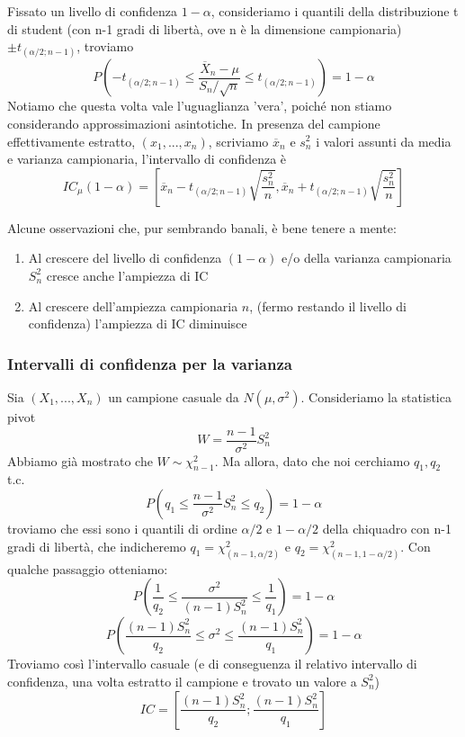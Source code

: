 Fissato un livello di confidenza $1-\alpha$, consideriamo i quantili della distribuzione t di student (con n-1 gradi di libertà, ove n è la dimensione campionaria) 
$\pm t_{(\alpha/2;n-1)}$, 
troviamo $$ P\left(-t_{(\alpha/2;n-1)} \leq \frac{\overline{X}_n - \mu}{S_n / \sqrt{n}}
 \leq t_{(\alpha/2;n-1)}\right) = 1 - \alpha $$
Notiamo che questa volta vale l'uguaglianza 'vera', poiché non stiamo considerando approssimazioni asintotiche. 
In presenza del campione effettivamente estratto, $(x_1,...,x_n)$, 
scriviamo $\overline{x}_n$ e $s^2_n$ i valori assunti da media e varianza campionaria,
l'intervallo di confidenza è $$IC_{\mu}(1-\alpha)=
\left[\overline{x}_n -
 t_{(\alpha / 2;n-1)} 
 \sqrt{\frac{s^2_n}{n}},
  \overline{x}_n + t_{(\alpha / 2;n-1)}\sqrt{\frac{s^2_n}{n}}\right]$$
\begin{oss}
Alcune osservazioni che, pur sembrando banali, è bene tenere a mente:
\begin{enumerate}
\item Al crescere del livello di confidenza $(1-\alpha)$ e/o della varianza campionaria $S^2_n$ cresce anche l'ampiezza di IC
\item Al crescere dell'ampiezza campionaria $n$, (fermo restando il livello di confidenza) l'ampiezza di IC diminuisce
\end{enumerate}
\end{oss}

\subsubsection{Intervalli di confidenza per la varianza}
Sia $(X_1,...,X_n)$ un campione casuale da $N(\mu,\sigma^2)$.
Consideriamo la statistica pivot $$W=\frac{n-1}{\sigma^2} S^2_n$$ Abbiamo già mostrato che $W \sim \chi^2_{n-1}$. 
Ma allora, dato che noi cerchiamo $q_1,q_2$ t.c. 
$$P \left( q_1 \leq \frac{n-1}{\sigma^2} S^2_n \leq q_2 \right) =1-\alpha$$ 
troviamo che essi sono i quantili di ordine $\alpha / 2$ e $1 - \alpha / 2$ della chiquadro con n-1 gradi di libertà, che indicheremo $q_1=\chi^2_{(n-1,\alpha / 2)}$ e $q_2=\chi^2_{(n-1,1 - \alpha / 2)}$.
Con qualche passaggio otteniamo:
$$P \left( \frac{1}{q_2} \leq \frac{\sigma^2}{(n-1) S^2_n} \leq \frac{1}{q_1} \right) =1-\alpha$$
$$P \left( \frac{(n-1) S^2_n}{q_2} \leq \sigma^2 \leq \frac{(n-1) S^2_n}{q_1} \right) =1-\alpha$$
Troviamo così l'intervallo casuale (e di conseguenza il relativo intervallo di confidenza, una volta estratto il campione e trovato un valore a $S^2_n$) $$IC=\left[ \frac{(n-1)S^2_n}{q_2};\frac{(n-1)S^2_n}{q_1} \right]$$

